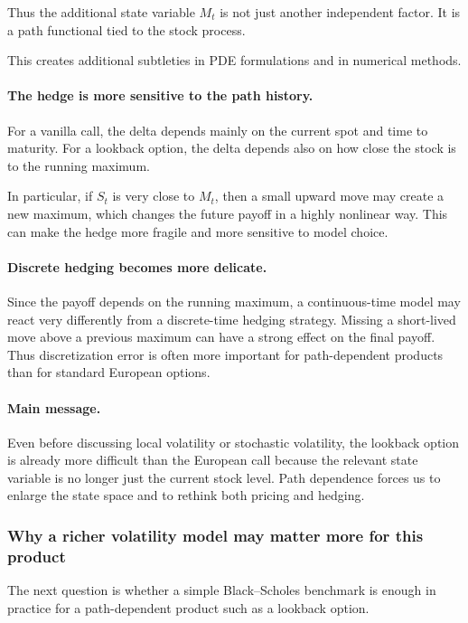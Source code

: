 \documentclass[11pt]{article}
\theoremstyle{plain}
\theoremstyle{definition}
\theoremstyle{remark}
\begin{document}
Thus the additional state variable \(M_t\) is not just another
independent factor.
It is a path functional tied to the stock process.

This creates additional subtleties in PDE formulations and in numerical
methods.

\paragraph{The hedge is more sensitive to the path history.}
For a vanilla call, the delta depends mainly on the current spot and
time to maturity.
For a lookback option, the delta depends also on how close the stock is
to the running maximum.

In particular, if \(S_t\) is very close to \(M_t\), then a small upward
move may create a new maximum, which changes the future payoff in a
highly nonlinear way.
This can make the hedge more fragile and more sensitive to model choice.

\paragraph{Discrete hedging becomes more delicate.}
Since the payoff depends on the running maximum, a continuous-time model
may react very differently from a discrete-time hedging strategy.
Missing a short-lived move above a previous maximum can have a strong
effect on the final payoff.
Thus discretization error is often more important for path-dependent
products than for standard European options.

\paragraph{Main message.}
Even before discussing local volatility or stochastic volatility, the
lookback option is already more difficult than the European call because
the relevant state variable is no longer just the current stock level.
Path dependence forces us to enlarge the state space and to rethink both
pricing and hedging.

\subsubsection{Why a richer volatility model may matter more for this product}

The next question is whether a simple Black--Scholes benchmark is enough
in practice for a path-dependent product such as a lookback option.
\end{document}
